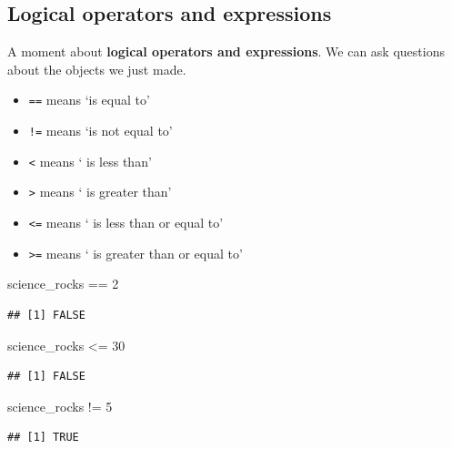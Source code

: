 \documentclass[]{book}
\newenvironment{Shaded}{\begin{snugshade}}{\end{snugshade}}
\newcommand{\DecValTok}[1]{\textcolor[rgb]{0.00,0.00,0.81}{{#1}}}
\newcommand{\StringTok}[1]{\textcolor[rgb]{0.31,0.60,0.02}{{#1}}}
\newcommand{\NormalTok}[1]{{#1}}
\providecommand{\tightlist}{%
  \setlength{\itemsep}{0pt}\setlength{\parskip}{0pt}}
\theoremstyle{definition}
\theoremstyle{definition}
\theoremstyle{definition}
\theoremstyle{remark}
\begin{document}
\subsection{Logical operators and
expressions}\label{logical-operators-and-expressions}

A moment about \textbf{logical operators and expressions}. We can ask
questions about the objects we just made.

\begin{itemize}
\tightlist
\item
  \texttt{==} means `is equal to'
\item
  \texttt{!=} means `is not equal to'
\item
  \texttt{\textless{}} means ` is less than'
\item
  \texttt{\textgreater{}} means ` is greater than'
\item
  \texttt{\textless{}=} means ` is less than or equal to'
\item
  \texttt{\textgreater{}=} means ` is greater than or equal to'
\end{itemize}

\begin{Shaded}
\begin{Highlighting}[]
\NormalTok{science_rocks ==}\StringTok{ }\DecValTok{2}
\end{Highlighting}
\end{Shaded}

\begin{verbatim}
## [1] FALSE
\end{verbatim}

\begin{Shaded}
\begin{Highlighting}[]
\NormalTok{science_rocks <=}\StringTok{ }\DecValTok{30}
\end{Highlighting}
\end{Shaded}

\begin{verbatim}
## [1] FALSE
\end{verbatim}

\begin{Shaded}
\begin{Highlighting}[]
\NormalTok{science_rocks !=}\StringTok{ }\DecValTok{5}
\end{Highlighting}
\end{Shaded}

\begin{verbatim}
## [1] TRUE
\end{verbatim}
\end{document}

